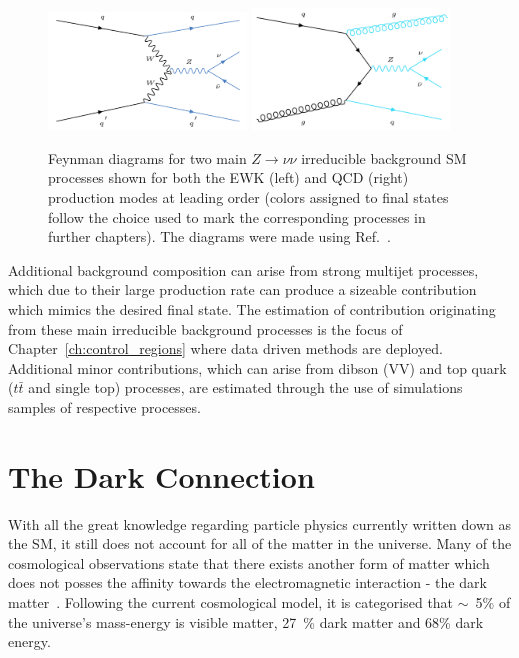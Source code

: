 \begin{figure}[htbp]
    \begin{center}
        \includegraphics[width=0.47\textwidth]{Theory/ewk_znunu.png}
        \includegraphics[width=0.47\textwidth]{Theory/qcd_znunu.png}
        \caption{Feynman diagrams for two main $Z\rightarrow \nu\nu$ irreducible background SM processes shown for both the EWK (left) and QCD (right) production modes at leading order (colors assigned to final states follow the choice used to mark the corresponding processes in further chapters). The diagrams were made using Ref.~\cite{fey_diag}.}
      \label{fig:znunu_diagram}
    \end{center}
  \end{figure}


\hspace{10pt} Additional background composition can arise from strong multijet processes, which due to their large production rate can produce a sizeable contribution which mimics the desired final state. The estimation of contribution originating from these main irreducible background processes is the focus of Chapter~\ref{ch:control_regions} where data driven methods are deployed. Additional minor contributions, which can arise from dibson (VV) and top quark ($t\bar{t}$ and single top) processes, are estimated through the use of simulations samples of respective processes.

\section{The Dark Connection}
\label{sec:dm}
\hspace{10pt} With all the great knowledge regarding particle physics currently written down as the SM, it still does not account for all of the matter in the universe. Many of the cosmological observations state that there exists another form of matter which does not posses the affinity towards the electromagnetic interaction - the dark matter~\cite{intro_dm}. Following the current cosmological model, it is categorised that $\sim$~5\% of the universe's mass-energy is visible matter, 27~\% dark matter and 68\% dark energy.

